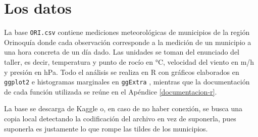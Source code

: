 \documentclass[oneside, openany, fontset=libertinus]{mitthesis}
\begin{document}


\chapter{Los datos}\label{datos}

La base \texttt{ORI.csv} contiene mediciones meteorológicas de
municipios de la región Orinoquía \parencite{ideam-datos} donde cada
observación corresponde a la medición de un municipio a una hora
concreta de un día dado. Las unidades se toman del enunciado del taller,
es decir, temperatura y punto de rocío en °C, velocidad del viento en
m/h y presión en hPa. Todo el análisis se realiza en R
\parencite{r-core} con gráficos elaborados en \texttt{ggplot2}
\parencite{ggplot2} e histogramas marginales en \texttt{ggExtra}
\parencite{ggextra}, mientras que la documentación de cada función
utilizada se reúne en el Apéndice \ref{documentacion-r}.

La base se descarga de Kaggle o, en caso de no haber conexión, se busca
una copia local detectando la codificación del archivo en vez de
suponerla, pues suponerla es justamente lo que rompe las tildes de los
municipios.
\end{document}
